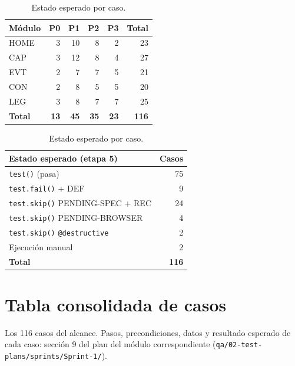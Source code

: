 \documentclass[11pt,a4paper]{article}
\begin{document}
\begin{table}[H]
\centering\small
\begin{minipage}[b]{0.52\textwidth}
\centering
\begin{tabular}{@{}l r r r r r@{}}
\toprule
Módulo & P0 & P1 & P2 & P3 & Total \\
\midrule
HOME & 3 & 10 & 8 & 2 & 23 \\
CAP & 3 & 12 & 8 & 4 & 27 \\
EVT & 2 & 7 & 7 & 5 & 21 \\
CON & 2 & 8 & 5 & 5 & 20 \\
LEG & 3 & 8 & 7 & 7 & 25 \\
\midrule
\textbf{Total} & \textbf{13} & \textbf{45} & \textbf{35} & \textbf{23} & \textbf{116} \\
\bottomrule
\end{tabular}
\caption{Casos por módulo y prioridad.}
\end{minipage}\hfill
\begin{minipage}[b]{0.44\textwidth}
\centering
\begin{tabular}{@{}l r@{}}
\toprule
Estado esperado (etapa 5) & Casos \\
\midrule
\texttt{test()} (pasa) & 75 \\
\texttt{test.fail()} + DEF & 9 \\
\texttt{test.skip()} PENDING-SPEC + REC & 24 \\
\texttt{test.skip()} PENDING-BROWSER & 4 \\
\texttt{test.skip()} \texttt{@destructive} & 2 \\
Ejecución manual & 2 \\
\midrule
\textbf{Total} & \textbf{116} \\
\bottomrule
\end{tabular}
\caption{Estado esperado por caso.}
\end{minipage}
\end{table}

\section{Tabla consolidada de casos}

Los 116 casos del alcance. Pasos, precondiciones, datos y resultado esperado de cada caso: sección 9
del plan del módulo correspondiente (\texttt{qa/02-test-plans/sprints/Sprint-1/}).
\end{document}

